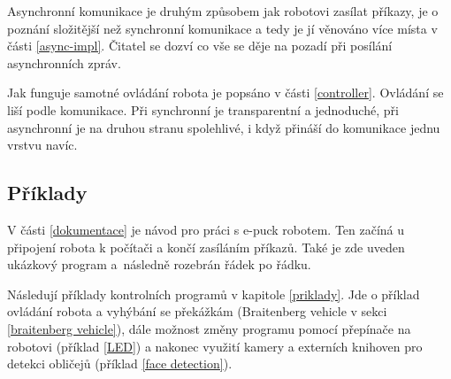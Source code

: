 Asynchronní komunikace je druhým způsobem jak robotovi zasílat příkazy, je
o poznání složitější než synchronní komunikace a tedy je jí věnováno více
místa v části \ref{async-impl}. Čitatel se dozví co vše se děje na pozadí
při posílání asynchronních zpráv.

Jak funguje samotné ovládání robota je popsáno v části \ref{controller}.
Ovládání se liší podle komunikace. Při synchronní je transparentní a
jednoduché, při asynchronní je na druhou stranu spolehlivé, i když přináší
do komunikace jednu vrstvu navíc.

\subsection*{Příklady}

V části \ref{dokumentace} je návod pro práci s e-puck robotem. Ten začíná u
připojení robota k počítači a končí zasíláním příkazů. Také je zde uveden
ukázkový program a~následně rozebrán řádek po řádku.

Následují příklady kontrolních programů v kapitole \ref{priklady}. Jde o
příklad ovládání robota a vyhýbání se překážkám (Braitenberg vehicle v
sekci \ref{braitenberg vehicle}), dále možnost změny programu pomocí
přepínače na robotovi (příklad \ref{LED}) a nakonec využití kamery a
externích knihoven pro detekci obličejů (příklad \ref{face detection}).

